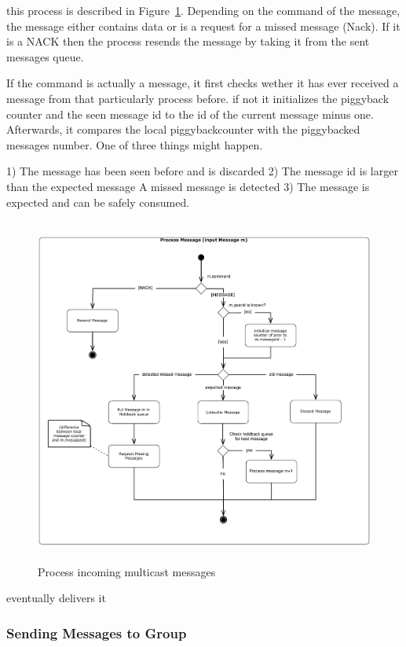 this process is described in Figure~\ref{fig:figures_processMessages}.
Depending on the command of the message, the message either contains data or is a request for a missed message (Nack). If it is a NACK  then the process resends the message by taking it from the sent messages queue.

If the command is actually a message, it first checks wether it has ever received a message from that particularly process before. if not it initializes the piggyback counter and the seen message id to the id of the current message minus one. 
Afterwards, it compares the local piggybackcounter with the piggybacked messages number. One of three things might happen. 

1) The message has been seen before and is discarded
2) The message id is larger than the expected message
    A missed message is detected
3) The message is expected and can be safely consumed.
 
\begin{figure}[htbp]
    \centering
        \includegraphics[height=4.5in]{figures/processMessages.pdf}
    \caption{Process incoming multicast messages}
    \label{fig:figures_processMessages}
\end{figure}

eventually delivers it

\subsubsection{Sending Messages to Group}

